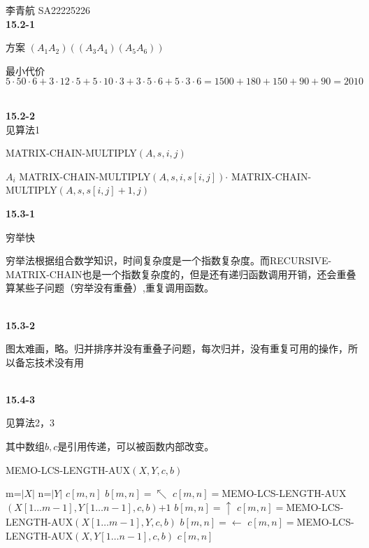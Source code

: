 \documentclass[UTF8]{ctexart}
\begin{document}
李青航 SA22225226\\

\noindent\textbf{15.2-1}

方案 $(A_1A_2)((A_3A_4)(A_5A_6))$

最小代价$ 5 \cdot 50 \cdot 6 + 3 \cdot 12 \cdot 5 + 5 \cdot 10 \cdot 3 + 3 \cdot 5 \cdot 6 + 5 \cdot 3 \cdot 6 =
1500 + 180 + 150 + 90 + 90 = 2010$

~\\
\noindent\textbf{15.2-2}\\
见算法1
\begin{algorithm}
	\caption {MATRIX-CHAIN-MULTIPLY$(A,s,i,j)$}
	\label{alg:1}
	\begin{algorithmic}[1]
			\RETURN $A_i$
		\ENDIF
		\RETURN MATRIX-CHAIN-MULTIPLY$(A,s,i,s[i,j])$$\cdot$ MATRIX-CHAIN-MULTIPLY$(A,s,s[i,j]+1,j)$
	\end{algorithmic}
\end{algorithm}

\noindent\textbf{15.3-1}

穷举快

穷举法根据组合数学知识，时间复杂度是一个指数复杂度。而RECURSIVE-MATRIX-CHAIN也是一个指数复杂度的，但是还有递归函数调用开销，还会重叠算某些子问题（穷举没有重叠）,重复调用函数。

~\\
\noindent\textbf{15.3-2}

图太难画，略。归并排序并没有重叠子问题，每次归并，没有重复可用的操作，所以备忘技术没有用

~\\
\noindent\textbf{15.4-3}

见算法2，3

其中数组$b,c$是引用传递，可以被函数内部改变。

\begin{algorithm}
    \caption[]{MEMO-LCS-LENGTH-AUX$(X,Y,c,b)$}
    \label{alg:2}
    \begin{algorithmic}[1]
        \STATE m=$|X|$
        \STATE n=$|Y|$
            \RETURN $c[m,n]$
        \ENDIF
            \STATE $b[m,n]=\nwarrow$
            \STATE $c[m,n]=$MEMO-LCS-LENGTH-AUX$(X[1\dots m-1],Y[1\dots n-1],c,b)$$+1$
            \STATE $b[m,n]=\uparrow$
            \STATE $c[m,n]=$MEMO-LCS-LENGTH-AUX$(X[1\dots m-1],Y,c,b)$
        \ELSE 
            \STATE $b[m,n]=\leftarrow$
            \STATE $c[m,n]=$MEMO-LCS-LENGTH-AUX$(X,Y[1\dots n-1],c,b)$
        \ENDIF
        \RETURN $c[m,n]$
    \end{algorithmic}
\end{algorithm}
\end{document}
